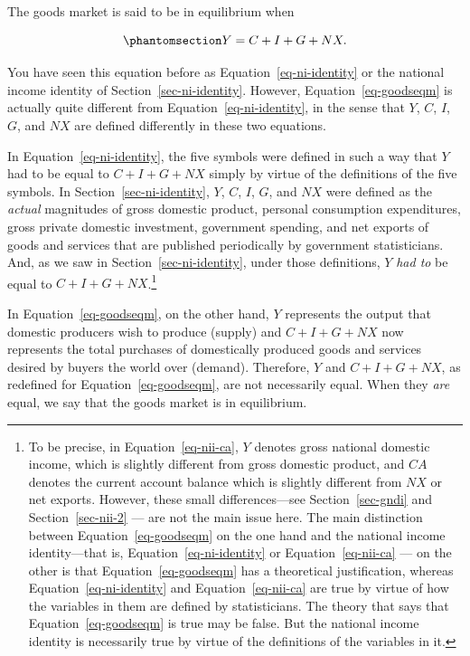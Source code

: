 \documentclass[
  letterpaper,
]{book}
\theoremstyle{plain}
\theoremstyle{remark}
\begin{document}
The goods market is said to be in equilibrium when

\begin{equation}\phantomsection\label{eq-goodseqm}{
Y=C+I+G+NX.
}\end{equation}

You have seen this equation before as Equation~\ref{eq-ni-identity} or
the national income identity of Section~\ref{sec-ni-identity}. However,
Equation~\ref{eq-goodseqm} is actually quite different from
Equation~\ref{eq-ni-identity}, in the sense that \(Y\), \(C\), \(I\),
\(G\), and \(NX\) are defined differently in these two equations.

In Equation~\ref{eq-ni-identity}, the five symbols were defined in such
a way that \(Y\) had to be equal to \(C+I+G+NX\) simply by virtue of the
definitions of the five symbols. In Section~\ref{sec-ni-identity},
\(Y\), \(C\), \(I\), \(G\), and \(NX\) were defined as the \emph{actual}
magnitudes of gross domestic product, personal consumption expenditures,
gross private domestic investment, government spending, and net exports
of goods and services that are published periodically by government
statisticians. And, as we saw in Section~\ref{sec-ni-identity}, under
those definitions, \(Y\) \emph{had to} be equal to
\(C+I+G+NX\).\footnote{To be precise, in Equation~\ref{eq-nii-ca}, \(Y\)
  denotes gross national domestic income, which is slightly different
  from gross domestic product, and \(CA\) denotes the current account
  balance which is slightly different from \(NX\) or net exports.
  However, these small differences---see Section~\ref{sec-gndi} and
  Section~\ref{sec-nii-2} --- are not the main issue here. The main
  distinction between Equation~\ref{eq-goodseqm} on the one hand and the
  national income identity---that is, Equation~\ref{eq-ni-identity} or
  Equation~\ref{eq-nii-ca} --- on the other is that
  Equation~\ref{eq-goodseqm} has a theoretical justification, whereas
  Equation~\ref{eq-ni-identity} and Equation~\ref{eq-nii-ca} are true by
  virtue of how the variables in them are defined by statisticians. The
  theory that says that Equation~\ref{eq-goodseqm} is true may be false.
  But the national income identity is necessarily true by virtue of the
  definitions of the variables in it.}

In Equation~\ref{eq-goodseqm}, on the other hand, \(Y\) represents the
output that domestic producers wish to produce (supply) and \(C+I+G+NX\)
now represents the total purchases of domestically produced goods and
services desired by buyers the world over (demand). Therefore, \(Y\) and
\(C+I+G+NX\), as redefined for Equation~\ref{eq-goodseqm}, are not
necessarily equal. When they \emph{are} equal, we say that the goods
market is in equilibrium.
\end{document}
